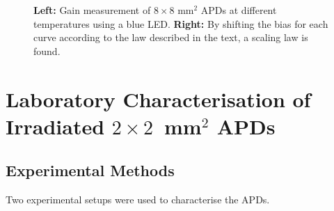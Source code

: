 \documentclass{article}
\begin{document}
\begin{figure}
  \centering
  \hfill
  \caption{\textbf{Left:} Gain measurement of $8 \times 8$ mm$^2$ APDs at different temperatures using a blue LED. \textbf{Right:} By shifting the bias for each curve according to the law described in the text, a scaling law is found.}
  \label{fig:gainfig}
\end{figure}


\section{Laboratory Characterisation of Irradiated $2 \times 2$~mm$^2$ APDs}
\label{sec:irrad2x2}

\subsection{Experimental Methods}

Two experimental setups were used to characterise the APDs.
\end{document}

